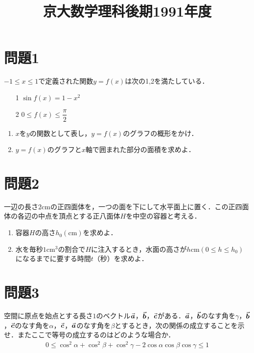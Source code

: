 \documentclass[unicode,12pt, A4j]{ltjsarticle}%
\title{京大数学理科後期1991年度}
\author{}
\date{}
\begin{document}
\maketitle

\section{問題1}
$-1\le x\le 1$で定義された関数$y=f(x)$は次の1,2を満たしている．
\begin{itemize}
 \item[1] $\sin f(x) = 1-x^2$
 \item[2] $0\le f(x)\le \dfrac{\pi}{2}$
\end{itemize}
\begin{enumerate}
 \item $x$を$y$の関数として表し，$y=f(x)$のグラフの概形をかけ．
 \item $y=f(x)$のグラフと$x$軸で囲まれた部分の面積を求めよ．
\end{enumerate}

\section{問題2}
一辺の長さ$2\mathrm{cm}$の正四面体を，一つの面を下にして水平面上に置く．この正四面体の各辺の中点を頂点とする正八面体$H$を中空の容器と考える．
\begin{enumerate}
 \item 容器$H$の高さ$h_0(\mathrm{cm})$を求めよ．
 \item 水を毎秒$1\mathrm{cm}^3$の割合で$H$に注入するとき，水面の高さが$h \mathrm{cm} (0\le h\le h_0)$になるまでに要する時間$t$（秒）を求めよ．
\end{enumerate}

\section{問題3}
空間に原点を始点とする長さ$1$のベクトル$\va*{a}$，$\va*{b}$，$\va*{c}$がある．$\va*{a}$，$\va*{b}$のなす角を$\gamma$，$\va*{b}$，$\va*{c}$のなす角を$\alpha$，$\va*{c}$，$\va*{a}$のなす角を$\beta$とするとき，次の関係の成立することを示せ．またここで等号の成立するのはどのような場合か．
\begin{align*}
 0\le \cos^2\alpha+\cos^2\beta+\cos^2\gamma-2\cos\alpha \cos\beta \cos\gamma \le 1
\end{align*}
\end{document}
